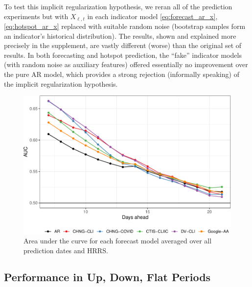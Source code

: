 \documentclass[9pt,twocolumn,twoside,lineno]{pnas-new}
\begin{document}
To test this implicit regularization hypothesis, we reran all of the prediction
experiments but with $X_{\ell,t}$ in each indicator model \eqref{eq:forecast_ar_x},
\eqref{eq:hotspot_ar_x} replaced with suitable random noise (bootstrap
samples form an indicator's historical distribution).  The results, shown and
explained more precisely in the supplement, are vastly different (worse) than
the original set of results.  In both forecasting and hotspot prediction, the
``fake'' indicator models (with random noise as auxiliary features) offered
essentially no improvement over the pure AR model, which provides a strong
rejection (informally speaking) of the implicit regularization hypothesis.     

\begin{figure}[t]
\includegraphics[width=\columnwidth]{fig/hot-1.pdf}
\caption{Area under the curve for each forecast model averaged over all
  prediction dates and HRRS.}
\label{fig:hotspot}
\end{figure}

\subsection{Performance in Up, Down, Flat Periods}
\end{document}
